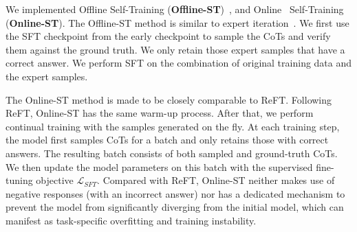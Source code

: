 We implemented Offline Self-Training (\textbf{Offline-ST})~\cite{he2020revisiting}, and Online~\cite{hoi2021online} Self-Training (\textbf{Online-ST}).
The Offline-ST method is similar to expert iteration~\cite{anthony2017thinking,uesato2022solving,zelikman2022star}.
We first use the SFT checkpoint from the early checkpoint to sample the CoTs and verify them against the ground truth. 
We only retain those expert samples that have a correct answer.
We perform SFT on the combination of original training data and the expert samples.

The Online-ST method is made to be closely comparable to ReFT.
Following ReFT, Online-ST has the same warm-up process.
After that, we perform continual training with the samples generated on the fly.
At each training step, the model first samples CoTs for a batch and only retains those with correct answers. 
The resulting batch consists of both sampled and ground-truth CoTs.
We then update the model parameters on this batch with the supervised fine-tuning objective $\mathcal{L}_{SFT}$.
Compared with ReFT, Online-ST neither makes use of negative responses (with an incorrect answer) nor has a dedicated mechanism to prevent the model from significantly diverging from the initial model, which can manifest as task-specific overfitting and training instability.

